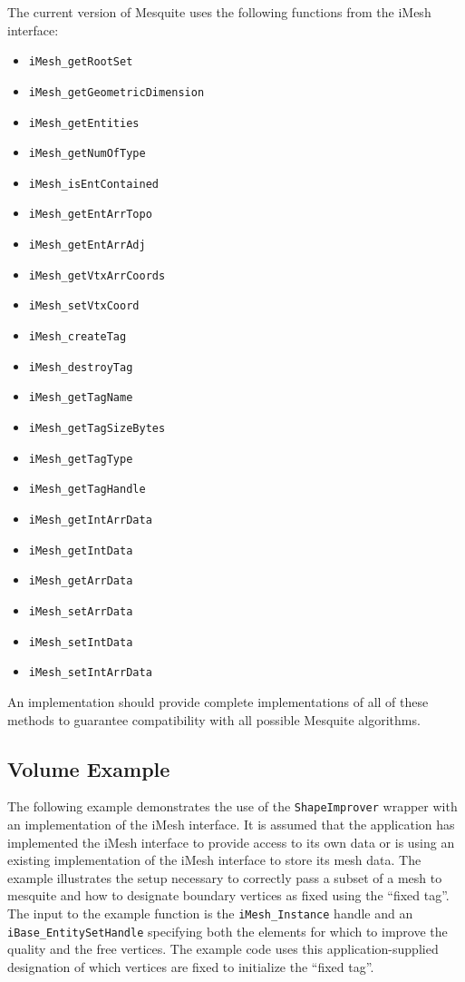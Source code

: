 The current version of Mesquite uses the following functions from the iMesh interface:
\begin{itemize}
\item \texttt{iMesh\_getRootSet}
\item \texttt{iMesh\_getGeometricDimension}
\item \texttt{iMesh\_getEntities}
\item \texttt{iMesh\_getNumOfType}
\item \texttt{iMesh\_isEntContained}
\item \texttt{iMesh\_getEntArrTopo}
\item \texttt{iMesh\_getEntArrAdj}
\item \texttt{iMesh\_getVtxArrCoords}
\item \texttt{iMesh\_setVtxCoord}
\item \texttt{iMesh\_createTag}
\item \texttt{iMesh\_destroyTag}
\item \texttt{iMesh\_getTagName}
\item \texttt{iMesh\_getTagSizeBytes}
\item \texttt{iMesh\_getTagType}
\item \texttt{iMesh\_getTagHandle}
\item \texttt{iMesh\_getIntArrData}
\item \texttt{iMesh\_getIntData}
\item \texttt{iMesh\_getArrData}
\item \texttt{iMesh\_setArrData}
\item \texttt{iMesh\_setIntData}
\item \texttt{iMesh\_setIntArrData}
\end{itemize}

An implementation should provide complete implementations of all of these methods to guarantee compatibility with all possible Mesquite algorithms. 

\subsection{Volume Example}

The following example demonstrates the use of the \texttt{ShapeImprover} wrapper with an implementation of the iMesh interface.  It is assumed that the application has implemented the iMesh interface to provide access to its own data or is using an existing implementation of the iMesh interface to store its mesh data.  The example illustrates the setup necessary to correctly pass a subset of a mesh to mesquite and how to designate boundary vertices as fixed using the ``fixed tag''.  The input to the example function is the \texttt{iMesh\_Instance} handle and an \texttt{iBase\_EntitySetHandle} specifying both the elements for which to improve the quality and the free vertices.  The example code uses this application-supplied designation of which vertices are fixed to initialize the ``fixed tag''.

